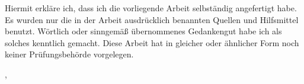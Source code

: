 

Hiermit erkläre ich, dass ich die vorliegende Arbeit selbständig angefertigt habe.
Es wurden nur die in der Arbeit ausdrücklich benannten Quellen und Hilfsmittel benutzt.
Wörtlich oder sinngemäß übernommenes Gedankengut habe ich als solches kenntlich gemacht.
Diese Arbeit hat in gleicher oder ähnlicher Form noch keiner Prüfungsbehörde vorgelegen.
\vspace{20mm}

\ort, \abgabedatum
\vspace{10mm}

\underline{\hspace{8cm}}\\\dokumentenautor